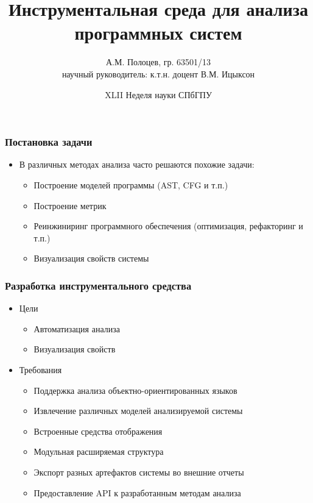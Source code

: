 \documentclass{beamer}
\title[]{Инструментальная среда для анализа программных систем}
\author[А.М. Полоцев]{
    А.М. Полоцев, гр. 63501/13\\
    научный руководитель: к.т.н. доцент В.М. Ицыксон
}
\institute[]{Санкт-Петербургский Политехнический Университет}
\date[XLII Неделя науки]{XLII Неделя науки СПбГПУ}
\begin{document}
\frame{\titlepage}
\begin{frame}
\frametitle{Постановка задачи}

\begin{itemize}
    \item В различных методах анализа часто решаются похожие задачи:
    \begin{itemize}
        \item Построение моделей программы (AST, CFG и т.п.)
        \item Построение метрик
        \item Реинжиниринг программного обеспечения (оптимизация, рефакторинг и т.п.)
        \item Визуализация свойств системы
    \end{itemize}
\end{itemize}
\pause
\begin{alertblock}{}
\end{alertblock}

\end{frame}
\begin{frame}
\frametitle{Разработка инструментального средства}

\begin{itemize}
    \item Цели
        \begin{itemize}
            \item Автоматизация анализа
            \item Визуализация свойств
        \end{itemize}
    \item Требования
        \begin{itemize}
            \item Поддержка анализа объектно-ориентированных языков
            \item Извлечение различных моделей анализируемой системы
            \item Встроенные средства отображения
            \item Модульная расширяемая структура
            \item Экспорт разных артефактов системы во внешние отчеты
            \item Предоставление API к разработанным методам анализа
        \end{itemize}
\end{itemize}
\end{frame}
\end{document}
